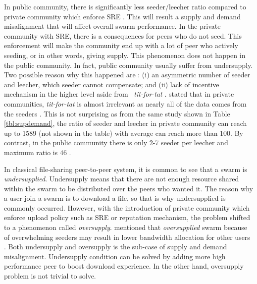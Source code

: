 In public community, there is significantly less seeder/leecher ratio compared to private community which enforce SRE \cite{2009:demandsupplyres:andrade,2010:pubpriv:meulpolder}. This will result a supply and demand misalignment that will affect overall swarm performance. In the private community with SRE, there is a consequences for peers who do not seed. This enforcement will make the community end up with a lot of peer who actively seeding, or in other words, giving supply. This phenomenon does not happen in the public community. In fact, public community usually suffer from undersupply. Two possible reason why this happened are : (i) an asymmetric number of seeder and leecher, which seeder cannot compensate; and (ii) lack of incentive mechanism in the higher level aside from \bt~\textit{tit-for-tat} \cite{2009:demandsupplyres:andrade}. \citeauthor{2010:pubpriv:meulpolder} stated that in private communities, \textit{tit-for-tat} is almost irrelevant as nearly all of the data comes from the seeders \cite{2010:pubpriv:meulpolder}. This is not surprising as from the same study shown in Table \ref{tbl:supdemand}, the ratio of seeder and leecher in private community can reach up to 1589 (not shown in the table) with average can reach more than 100. By contrast, in the public community there is only 2-7 seeder per leecher and maximum ratio is 46 \cite{2010:pubpriv:meulpolder}. 

In classical file-sharing peer-to-peer system, it is common to see that a swarm is \textit{undersupplied}. Undersupply means that there are not enough resource shared within the swarm to be distributed over the peers who wanted it. The reason why a user join a swarm is to download a file, so that is why undersupplied is commonly occurred. However, with the introduction of private community which enforce upload policy such as SRE or reputation mechanism, the problem shifted to a phenomenon called \textit{oversupply}. \citeauthor{2013:survivepriv:jia} mentioned that \textit{oversupplied} swarm because of overwhelming seeders may result in lower bandwidth allocation for other users \cite{2013:survivepriv:jia}. Both undersupply and oversupply is the sub-case of supply and demand misalignment. Undersupply condition can be solved by adding more high performance peer to boost download experience. In the other hand, oversupply problem is not trivial to solve.

